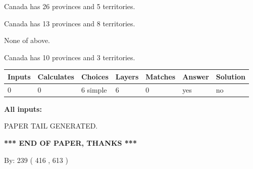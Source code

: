 \documentclass[12pt]{article}
\begin{document}
 
Canada has  26 provinces and  5 territories.
 
 
Canada has  13 provinces and  8 territories.
 
 
 None of above.
 
 
\noindent{}
 
 
Canada has 10  provinces and 3 territories.
 
 
\noindent{}
 
 
   
   
   
   
\noindent\begin{tabular}{|l|l|l|l|l|l|l|}
 \hline
Inputs & Calculates & Choices & Layers & Matches & Answer & Solution \\ \hline
 0  & 
 0  & 
 6
  simple  
  & 
 6  & 
 0  & 
  yes & 
  no 
  \\ \hline
 \end{tabular}
   
   
   
   
\noindent{}
   
   
   
   
\noindent\vspace{0.1in}\hspace{-0.08in} {\textbf{\Large{All inputs: }}}
   
   
   
   
   
   
 \vspace{0.2in}
 
   
   
\vspace{2.0in} PAPER TAIL GENERATED.
   
   
   
   
\vspace{1.0in} 
{\textbf{\large{ *** END OF PAPER, THANKS *** }}} 
   
   
\hspace{1.0in} By: 
 239 ( 416 ,  613 )
   
   
   
   
\newpage 
\setcounter{page}{ 
   424001 } 
   
   
   
\end{document}
